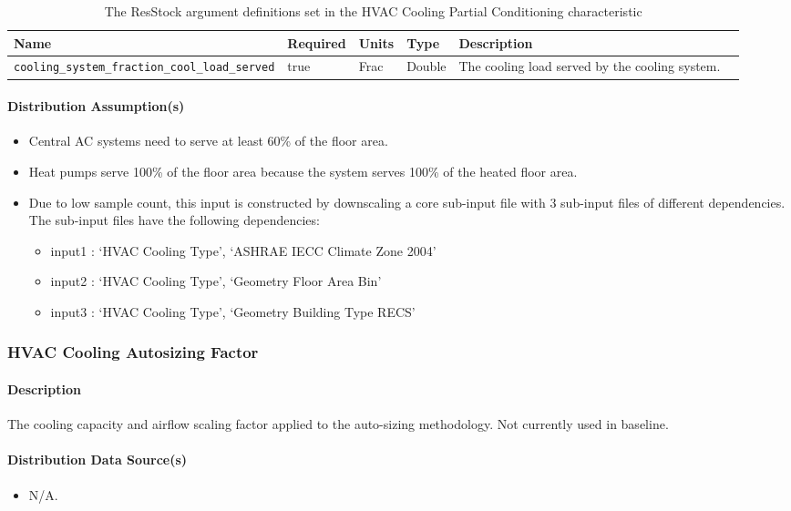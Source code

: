 \begin{longtable}[]{|p{3.5cm}|p{1.5cm}|p{1.3cm}|p{1.1cm}|p{}|p{3.3cm}|} \caption{The ResStock argument definitions set in the HVAC Cooling Partial Conditioning characteristic} \label{table:hc_arg_def_hvac_cool_par}\\
\toprule\noalign{}
Name & Required & Units & Type & Description \\
\midrule\noalign{}
\endhead
\bottomrule\noalign{}
\endlastfoot
\texttt{cooling\_system\_fraction\_cool\_load\_served} & true & Frac &
Double &  The cooling load served by the cooling system. \\
\end{longtable}
\paragraph{Distribution Assumption(s)}
\begin{itemize}
    \item Central AC systems need to serve at least 60\% of the floor area.
    \item Heat pumps serve 100\% of the floor area because the system serves 100\% of the heated floor area.
    \item Due to low sample count, this input is constructed by downscaling a core sub-input file with 3 sub-input files of different dependencies. The sub-input files have the following dependencies: 
    \begin{itemize}
        \item input1 : ‘HVAC Cooling Type’, ‘ASHRAE IECC Climate Zone 2004’
        \item input2 : ‘HVAC Cooling Type’, ‘Geometry Floor Area Bin’
        \item input3 : ‘HVAC Cooling Type’, ‘Geometry Building Type RECS’
    \end{itemize}
\end{itemize}
 

\subsubsection{HVAC Cooling Autosizing Factor}
\paragraph{Description}
The cooling capacity and airflow scaling factor applied to the auto-sizing methodology. Not currently used in baseline. 

\paragraph{Distribution Data Source(s)}
\begin{itemize}
\item N/A.
\end{itemize}
